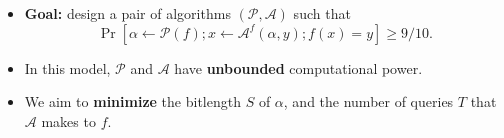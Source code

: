 \documentclass[usenames, dvipsnames, t, table]{beamer}
\newcommand{\A}{\mathcal{A}}
\renewcommand{\P}{\mathcal{P}}
\begin{document}
\begin{frame}[fragile]
\begin{itemize}
   \item \textbf{Goal:} design a pair of algorithms $(\P, \A)$ \newline such that
     \[\Pr[\alpha \gets \P(f); x \gets \A^f(\alpha, y); f(x) = y] \geq 9/10.\]
     \mypause
   \item In this model, $\P$ and $\A$ have \textbf{unbounded} computational power.
     \pause
   \item We aim to \textbf{minimize} the bitlength $S$ of $\alpha$, and the number of queries $T$ that $\A$ makes to $f$.
   \end{itemize}
 \end{frame}

\end{document}

